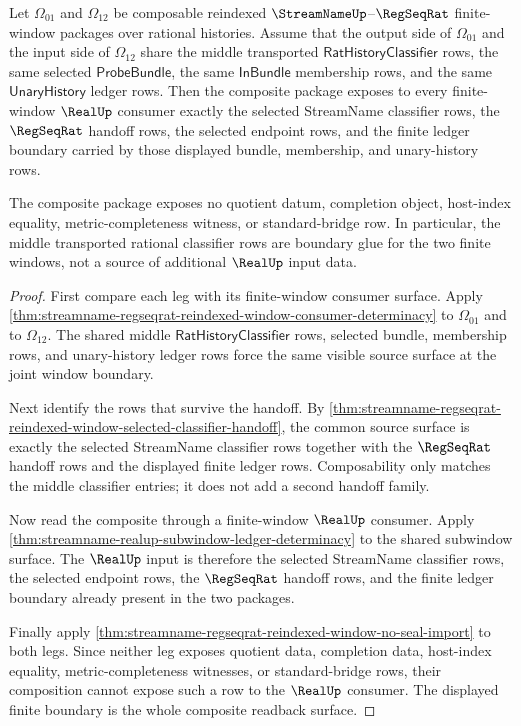 \begin{theorem}
\label{thm:streamname-regseqrat-reindexed-window-composite-realup-boundary}
Let $\Omega_{01}$ and $\Omega_{12}$ be composable reindexed
$\StreamNameUp$--$\RegSeqRat$ finite-window packages over rational histories.
Assume that the output side of $\Omega_{01}$ and the input side of
$\Omega_{12}$ share the middle transported $\mathsf{RatHistoryClassifier}$
rows, the same selected $\mathsf{ProbeBundle}$, the same $\mathsf{InBundle}$
membership rows, and the same $\mathsf{UnaryHistory}$ ledger rows. Then the
composite package exposes to every finite-window $\RealUp$ consumer exactly the
selected StreamName classifier rows, the $\RegSeqRat$ handoff rows, the selected
endpoint rows, and the finite ledger boundary carried by those displayed
bundle, membership, and unary-history rows.

The composite package exposes no quotient datum, completion object, host-index
equality, metric-completeness witness, or standard-bridge row. In particular,
the middle transported rational classifier rows are boundary glue for the two
finite windows, not a source of additional $\RealUp$ input data.
\end{theorem}
\begin{proof}
First compare each leg with its finite-window consumer surface. Apply
\autoref{thm:streamname-regseqrat-reindexed-window-consumer-determinacy} to
$\Omega_{01}$ and to $\Omega_{12}$. The shared middle
$\mathsf{RatHistoryClassifier}$ rows, selected bundle, membership rows, and
unary-history ledger rows force the same visible source surface at the joint
window boundary.

Next identify the rows that survive the handoff. By
\autoref{thm:streamname-regseqrat-reindexed-window-selected-classifier-handoff},
the common source surface is exactly the selected StreamName classifier rows
together with the $\RegSeqRat$ handoff rows and the displayed finite ledger
rows. Composability only matches the middle classifier entries; it does not add
a second handoff family.

Now read the composite through a finite-window $\RealUp$ consumer. Apply
\autoref{thm:streamname-realup-subwindow-ledger-determinacy} to the shared
subwindow surface. The $\RealUp$ input is therefore the selected StreamName
classifier rows, the selected endpoint rows, the $\RegSeqRat$ handoff rows, and
the finite ledger boundary already present in the two packages.

Finally apply
\autoref{thm:streamname-regseqrat-reindexed-window-no-seal-import} to both
legs. Since neither leg exposes quotient data, completion data, host-index
equality, metric-completeness witnesses, or standard-bridge rows, their
composition cannot expose such a row to the $\RealUp$ consumer. The displayed
finite boundary is the whole composite readback surface.
\end{proof}


